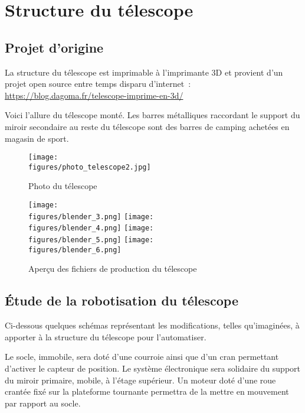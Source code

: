 \chapter{Structure du télescope}

\section{Projet d'origine}

La structure du télescope est imprimable à l'imprimante 3D et provient d'un projet open source entre temps disparu d'internet~:
\url{https://blog.dagoma.fr/telescope-imprime-en-3d/}

\vspace{1cm}

Voici l'allure du télescope monté. Les barres métalliques raccordant le support du miroir secondaire au reste du télescope sont des barres de camping achetées en magasin de sport.

\begin{figure}[H]
    \centering
    \texttt{[image: \\figures/photo\_telescope2.jpg]}
    \decoRule
    \caption[
    Photo du télescope]{
    Photo du télescope}
    \label{fig:Photo du télescope}
    \end{figure}

\begin{figure}[H]
    \centering
    \texttt{[image: \\figures/blender\_3.png]}
    \texttt{[image: \\figures/blender\_4.png]}
    \texttt{[image: \\figures/blender\_5.png]}
    \texttt{[image: \\figures/blender\_6.png]}
    \decoRule
    \caption[
    Aperçu des fichiers de production du télescope]{
    Aperçu des fichiers de production du télescope}
    \label{fig:Aperçu des fichiers de production du télescope}
    \end{figure}

\section{Étude de la robotisation du télescope}

Ci-dessous quelques schémas représentant les modifications, telles qu'imaginées, à apporter à la structure du télescope pour l'automatiser.

\vspace{1cm}

Le socle, immobile, sera doté d'une courroie ainsi que d'un cran permettant d'activer le capteur de position. Le système électronique sera solidaire du support du miroir primaire, mobile, à l'étage supérieur. Un moteur doté d'une roue crantée fixé sur la plateforme tournante permettra de la mettre en mouvement par rapport au socle.

